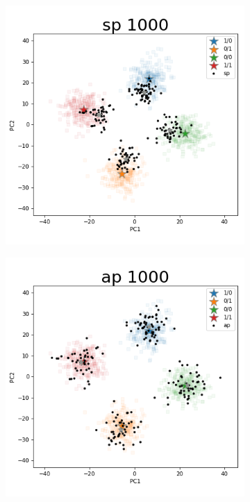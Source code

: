 \documentclass{article}
\begin{document}
\begin{figure}[p]
\begin{subfigure}{.5\textwidth}
  \centering
  \includegraphics[width=.98\linewidth]{img/ggsim1000_100000_200_2_1_100_1_sturef_ggsim1000_100000_1000_2_1_100_0_sp}
\end{subfigure}%
\begin{subfigure}{.5\textwidth}
  \centering
  \includegraphics[width=.98\linewidth]{img/ggsim1000_100000_200_2_1_100_1_sturef_ggsim1000_100000_1000_2_1_100_0_ap}

\end{subfigure}
\end{figure}
\end{document}
